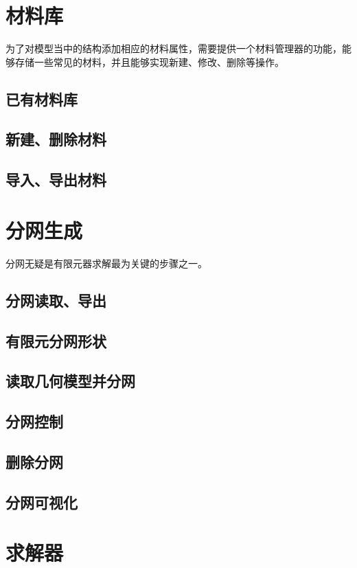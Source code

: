 \section{材料库}
为了对模型当中的结构添加相应的材料属性，需要提供一个材料管理器的功能，能够存储一些常见的材料，并且能够实现新建、修改、删除等操作。
\subsection{已有材料库}

\subsection{新建、删除材料}

\subsection{导入、导出材料}

\section{分网生成}
分网无疑是有限元器求解最为关键的步骤之一。
\subsection{分网读取、导出}

\subsection{有限元分网形状}

\subsection{读取几何模型并分网}

\subsection{分网控制}

\subsection{删除分网}

\subsection{分网可视化}

\section{求解器}

